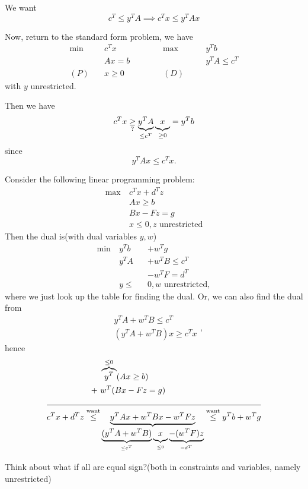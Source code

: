 We want
\[
	c^{T}\leq y^{T}A\implies c^{T}x\leq y^{T} Ax
\]

Now, return to the standard form problem, we have
\[
	\begin{alignedat}{5}
		\min~&c^{T}x\qquad\qquad &&\max ~ &&y^{T}b\\
		&Ax = b && &&y^{T}A\leq c^{T}\\
		(P)\quad&x\geq  0 &&(D)\quad&&
	\end{alignedat}
\]
with \(y\) unrestricted.

Then we have
\[
	c^{T}x\underset{?}{\geq} \underbrace{y^{T}A}_{\leq c^{T}}\underbrace{\vphantom{y^{T}A}x}_{\geq 0} = y^{T} b
\]
since \[
	y^{T}Ax\leq c^{T}x.
\]

\begin{eg}
	Consider the following linear programming problem:
	\begin{align*}
		\max~ & c^{T}x+d^{T}z                  \\
		      & Ax\geq b                       \\
		      & Bx - Fz = g                    \\
		      & x\leq 0, z\text{ unrestricted}
	\end{align*}
	Then the dual is(with dual variables \(y, w\))
	\[
		\begin{alignedat}{3}
			\min~ & y^{T}b   &&+w^{T}g            \\
			& y^{T}A  &&+w^{T}B  \leq c^{T} \\
			& &&-w^{T}F = d^{T}    \\
			& y\leq &&0, w \text{ unrestricted},
		\end{alignedat}
	\]
	where we just look up the table for finding the dual. Or, we can also find the dual from
	\[
		\begin{split}
			&y^{T} A + w^{T} B\leq c^{T}\\
			&(y^{T} A+w^{T} B)x\geq c^{T} x
		\end{split},
	\]
	hence
	\[
		\begin{split}
			&\overbrace{y^{T}}^{\leq 0}(Ax\geq b)\\
			+\ &w^{T}(Bx - Fz = g)\\
			\cline{1-2}
			c^{T}x + d^{T}z\overset{\text{want}}{\leq}&\underbrace{y^{T}Ax + w^{T}Bx - w^{T} Fz}_{\underbrace{(y^{T} A + w^{T} B)}_{\leq c^{T}}\underbrace{\vphantom{y^{T}A}x}_{\leq 0} \underbrace{- (w^{T} F)z}_{=d^{T}}} \overset{\text{want}}{\leq} y^{T}b+w^{T}g
		\end{split}
	\]
\end{eg}
\begin{remark}
	Think about what if all are equal sign?(both in constraints and variables, namely unrestricted)
\end{remark}

